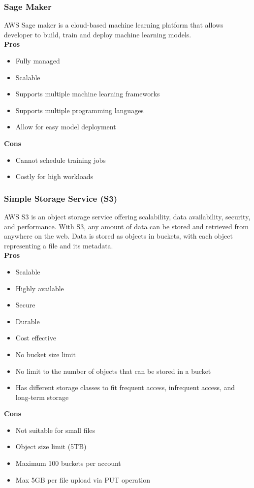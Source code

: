         \subsubsection{Sage Maker}
        \label{aws:sage-maker}
        AWS Sage maker is a cloud-based machine learning platform that allows developer to build, train and deploy machine learning models.\\
        \textbf{Pros}
        \begin{itemize}
            \item Fully managed
            \item Scalable
            \item Supports multiple machine learning frameworks
            \item Supports multiple programming languages
            \item Allow for easy model deployment
        \end{itemize}
        \textbf{Cons}
        \begin{itemize}
            \item Cannot schedule training jobs
            \item Costly for high workloads
        \end{itemize}

        \subsubsection{Simple Storage Service (S3)} 
        \label{aws:s3}
        AWS S3 is an object storage service offering scalability, data availability, security, and performance.
        With S3, any amount of data can be stored and retrieved from anywhere on the web. 
        Data is stored as objects in buckets, with each object representing a file and its metadata.\\
        \textbf{Pros}
        \begin{itemize}
            \item Scalable
            \item Highly available
            \item Secure
            \item Durable
            \item Cost effective
            \item No bucket size limit
            \item No limit to the number of objects that can be stored in a bucket
            \item Has different storage classes to fit frequent access, infrequent access, and long-term storage
        \end{itemize}
        \textbf{Cons}
        \begin{itemize}
            \item Not suitable for small files
            \item Object size limit (5TB)
            \item Maximum 100 buckets per account
            \item Max 5GB per file upload via PUT operation
        \end{itemize}


